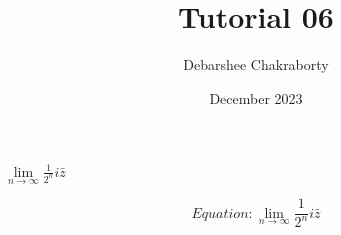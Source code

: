 \documentclass{article}
\title{Tutorial 06}
\author{Debarshee Chakraborty}
\date{December 2023}
\begin{document}
\maketitle

$\lim\limits_{n \to \infty} \frac{1}{2^n} i\bar z$


\begin{equation}
    Equation:  \lim\limits_{n \to \infty} \frac{1}{2^n} i\bar z
\end{equation}
\end{document}
